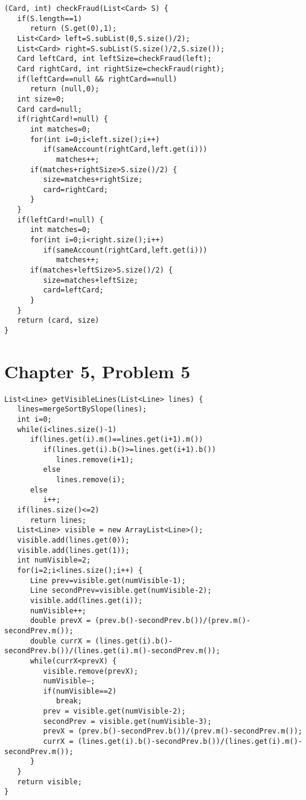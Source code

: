 \documentclass[12pt]{article}
\begin{document}
\begin{verbatim}
(Card, int) checkFraud(List<Card> S) {
   if(S.length==1)
      return (S.get(0),1);
   List<Card> left=S.subList(0,S.size()/2);
   List<Card> right=S.subList(S.size()/2,S.size());
   Card leftCard, int leftSize=checkFraud(left);
   Card rightCard, int rightSize=checkFraud(right);
   if(leftCard==null && rightCard==null)
      return (null,0);
   int size=0;
   Card card=null;
   if(rightCard!=null) {
      int matches=0;
      for(int i=0;i<left.size();i++)
         if(sameAccount(rightCard,left.get(i)))
            matches++;
      if(matches+rightSize>S.size()/2) {
         size=matches+rightSize;
         card=rightCard;
      }
   }
   if(leftCard!=null) {
      int matches=0;
      for(int i=0;i<right.size();i++)
         if(sameAccount(rightCard,left.get(i)))
            matches++;
      if(matches+leftSize>S.size()/2) {
         size=matches+leftSize;
         card=leftCard;
      }
   }
   return (card, size)
}
\end{verbatim}

\pagebreak

\section*{Chapter 5, Problem 5}

\begin{verbatim}
List<Line> getVisibleLines(List<Line> lines) {
   lines=mergeSortBySlope(lines);
   int i=0;
   while(i<lines.size()-1)
      if(lines.get(i).m()==lines.get(i+1).m())
         if(lines.get(i).b()>=lines.get(i+1).b())
            lines.remove(i+1);
         else
            lines.remove(i);
      else
         i++;
   if(lines.size()<=2)
      return lines;
   List<Line> visible = new ArrayList<Line>();
   visible.add(lines.get(0));
   visible.add(lines.get(1));
   int numVisible=2;
   for(i=2;i<lines.size();i++) {
      Line prev=visible.get(numVisible-1);
      Line secondPrev=visible.get(numVisible-2);
      visible.add(lines.get(i));
      numVisible++;
      double prevX = (prev.b()-secondPrev.b())/(prev.m()-secondPrev.m());
      double currX = (lines.get(i).b()-secondPrev.b())/(lines.get(i).m()-secondPrev.m());
      while(currX<prevX) {
         visible.remove(prevX);
         numVisible—;
         if(numVisible==2)
            break;
         prev = visible.get(numVisible-2);
         secondPrev = visible.get(numVisible-3);
         prevX = (prev.b()-secondPrev.b())/(prev.m()-secondPrev.m());
         currX = (lines.get(i).b()-secondPrev.b())/(lines.get(i).m()-secondPrev.m());
      }
   }
   return visible;
}
\end{verbatim}

\pagebreak
\end{document}
